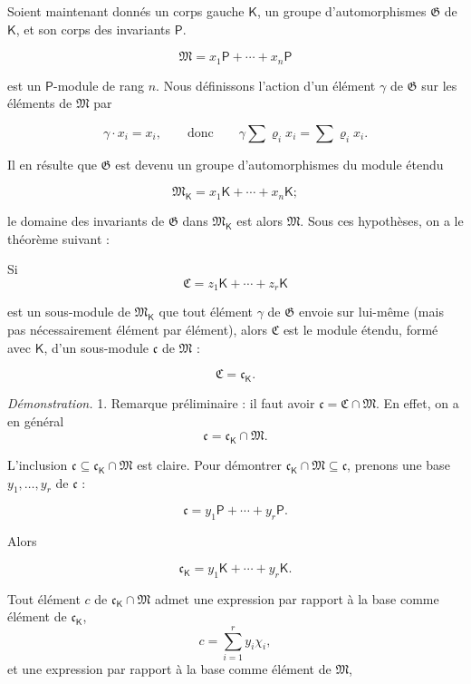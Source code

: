 Soient maintenant donnés un corps gauche \(\mathsf K\), un groupe d'automorphismes \(\mathfrak G\) de \(\mathsf K\), et son corps des invariants \(\mathsf P\).

\[
\mathfrak M=x_1\mathsf P+\cdots+x_n\mathsf P
\]

est un \(\mathsf P\)-module de rang \(n\). Nous définissons l'action d'un élément \(\gamma\) de \(\mathfrak G\) sur les éléments de \(\mathfrak M\) par

\[
\gamma\cdot x_i=x_i,
\qquad\text{donc}\qquad
\gamma\sum \varrho_i x_i=\sum \varrho_i x_i.
\]

Il en résulte que \(\mathfrak G\) est devenu un groupe d'automorphismes du module étendu

\[
\mathfrak M_{\mathsf K}=x_1\mathsf K+\cdots+x_n\mathsf K;
\]

le domaine des invariants de \(\mathfrak G\) dans \(\mathfrak M_{\mathsf K}\) est alors \(\mathfrak M\). Sous ces hypothèses, on a le théorème suivant :

Si
\[
\mathfrak C=z_1\mathsf K+\cdots+z_r\mathsf K
\]

est un sous-module de \(\mathfrak M_{\mathsf K}\) que tout élément \(\gamma\) de \(\mathfrak G\) envoie sur lui-même (mais pas nécessairement élément par élément), alors \(\mathfrak C\) est le module étendu, formé avec \(\mathsf K\), d'un sous-module \(\mathfrak c\) de \(\mathfrak M\) :

\[
\mathfrak C=\mathfrak c_{\mathsf K}.
\]

\emph{Démonstration.} 1. Remarque préliminaire : il faut avoir \(\mathfrak c=\mathfrak C\cap\mathfrak M\). En effet, on a en général
\[
\mathfrak c=\mathfrak c_{\mathsf K}\cap\mathfrak M.
\]

L'inclusion \(\mathfrak c\subseteq\mathfrak c_{\mathsf K}\cap\mathfrak M\) est claire. Pour démontrer \(\mathfrak c_{\mathsf K}\cap\mathfrak M\subseteq\mathfrak c\), prenons une base \(y_1,\ldots,y_r\) de \(\mathfrak c\) :

\[
\mathfrak c=y_1\mathsf P+\cdots+y_r\mathsf P.
\]

Alors

\[
\mathfrak c_{\mathsf K}=y_1\mathsf K+\cdots+y_r\mathsf K.
\]

Tout élément \(c\) de \(\mathfrak c_{\mathsf K}\cap\mathfrak M\) admet une expression par rapport à la base comme élément de \(\mathfrak c_{\mathsf K}\),
\[
c=\sum_{i=1}^{r}y_i\chi_i,
\]
et une expression par rapport à la base comme élément de \(\mathfrak M\),

